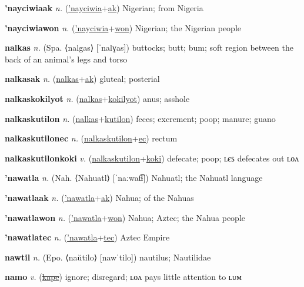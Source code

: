 \textbf{\hypertarget{'nayciwiaak}{'nayciwiaak}} \textit{n.} (\hyperlink{'nayciwia}{'nayciwia}+\allowbreak \hyperlink{ak}{ak})
Nigerian; from Nigeria

\textbf{\hypertarget{'nayciwiawon}{'nayciwiawon}} \textit{n.} (\hyperlink{'nayciwia}{'nayciwia}+\allowbreak \hyperlink{won}{won})
Nigerian; the Nigerian people

\textbf{\hypertarget{nalkas}{nalkas}} \textit{n.} (Spa. ⟨nalgas⟩ [ˈnalɣas])
buttocks; butt; bum; soft region between the back of an animal’s legs and torso

\textbf{\hypertarget{nalkasak}{nalkasak}} \textit{n.} (\hyperlink{nalkas}{nalkas}+\allowbreak \hyperlink{ak}{ak})
gluteal; posterial

\textbf{\hypertarget{nalkaskokilyot}{nalkaskokilyot}} \textit{n.} (\hyperlink{nalkas}{nalkas}+\allowbreak \hyperlink{kokilyot}{kokilyot})
anus; asshole

\textbf{\hypertarget{nalkaskutilon}{nalkaskutilon}} \textit{n.} (\hyperlink{nalkas}{nalkas}+\allowbreak \hyperlink{kutilon}{kutilon})
feces; excrement; poop; manure; guano

\textbf{\hypertarget{nalkaskutilonec}{nalkaskutilonec}} \textit{n.} (\hyperlink{nalkaskutilon}{nalkaskutilon}+\allowbreak \hyperlink{ec}{ec})
rectum

\textbf{\hypertarget{nalkaskutilonkoki}{nalkaskutilonkoki}} \textit{v.} (\hyperlink{nalkaskutilon}{nalkaskutilon}+\allowbreak \hyperlink{koki}{koki})
defecate; poop; ʟєꜱ defecates out ʟᴏᴧ

\textbf{\hypertarget{'nawatla}{'nawatla}} \textit{n.} (Nah. ⟨Nahuatl⟩ [ˈnaːwat͡ɬ])
Nahuatl; the Nahuatl language

\textbf{\hypertarget{'nawatlaak}{'nawatlaak}} \textit{n.} (\hyperlink{'nawatla}{'nawatla}+\allowbreak \hyperlink{ak}{ak})
Nahua; of the Nahuas

\textbf{\hypertarget{'nawatlawon}{'nawatlawon}} \textit{n.} (\hyperlink{'nawatla}{'nawatla}+\allowbreak \hyperlink{won}{won})
Nahua; Aztec; the Nahua people

\textbf{\hypertarget{'nawatlatec}{'nawatlatec}} \textit{n.} (\hyperlink{'nawatla}{'nawatla}+\allowbreak \hyperlink{tec}{tec})
Aztec Empire

\textbf{\hypertarget{nawtil}{nawtil}} \textit{n.} (Epo. ⟨naŭtilo⟩ [nawˈtilo])
nautilus; Nautilidae

\textbf{\hypertarget{namo}{namo}} \textit{v.} (\hyperlink{kape}{\sout{kape}})
ignore; disregard; ʟᴏᴧ pays little attention to ʟᴜᴍ

